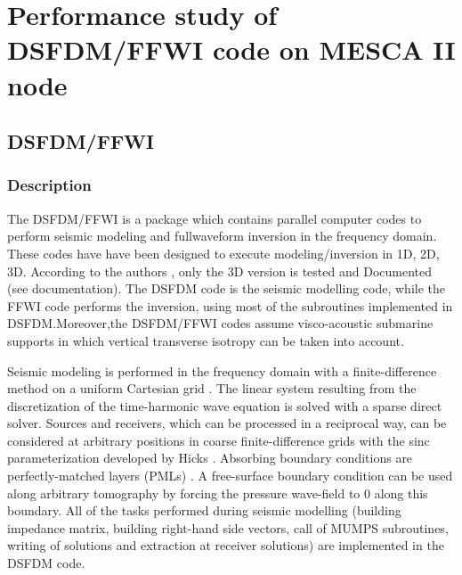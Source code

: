 \chapter{Performance study of DSFDM/FFWI code on MESCA II node} \label{dsfdm}
\section{DSFDM/FFWI}
\subsection{Description}
The DSFDM/FFWI is a package which contains parallel computer codes to perform seismic modeling and fullwaveform inversion in the frequency domain. These codes have have been designed to execute modeling/inversion in 1D, 2D, 3D. According to the authors \cite{Operto2007, Operto2014, Operto2015, Brossier2010, Amestoy2016}, only the 3D version is tested and Documented (see documentation). The DSFDM code is the seismic modelling code, while the FFWI code performs the inversion, using most of the subroutines implemented in DSFDM.Moreover,the DSFDM/FFWI codes assume visco-acoustic submarine supports in which vertical transverse isotropy can be taken into account.

Seismic modeling is performed in the frequency domain with a finite-difference method on a uniform Cartesian grid \cite{Operto2007, Operto2014, Brossier2010}. The linear system resulting from the discretization of the time-harmonic wave equation is solved with a sparse direct solver. Sources and receivers, which can be processed in a reciprocal way, can be considered at arbitrary positions in coarse finite-difference grids with the sinc parameterization developed by Hicks \cite{Hicks2002}. Absorbing boundary conditions are perfectly-matched layers (PMLs) \cite{Berenger1994, Operto2007}. A free-surface boundary condition can be used along arbitrary tomography by forcing the pressure wave-field to 0 along this boundary. All of the tasks performed during seismic modelling (building impedance matrix, building right-hand side vectors, call of MUMPS subroutines, writing of solutions and extraction at receiver solutions) are implemented in the DSFDM code.

